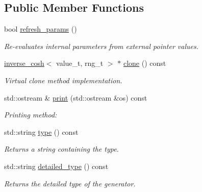 \subsection*{Public Member Functions}
\begin{DoxyCompactItemize}
\item 
bool \hyperlink{a00320_af6c6edb1d3b7a3be19759225598eff8c}{refresh\+\_\+params} ()
\begin{DoxyCompactList}\small\item\em Re-\/evaluates internal parameters from external pointer values. \end{DoxyCompactList}\item 
\hypertarget{a00320_a93ef78d56e7320e6b6a7390778948174}{}\hyperlink{a00320}{inverse\+\_\+cosh}$<$ value\+\_\+t, rng\+\_\+t $>$ $\ast$ \hyperlink{a00320_a93ef78d56e7320e6b6a7390778948174}{clone} () const \label{a00320_a93ef78d56e7320e6b6a7390778948174}

\begin{DoxyCompactList}\small\item\em Virtual clone method implementation. \end{DoxyCompactList}\item 
\hypertarget{a00320_a76a112a6561c0889cff37180e653f1ca}{}std\+::ostream \& \hyperlink{a00320_a76a112a6561c0889cff37180e653f1ca}{print} (std\+::ostream \&os) const \label{a00320_a76a112a6561c0889cff37180e653f1ca}

\begin{DoxyCompactList}\small\item\em Printing method\+: \end{DoxyCompactList}\item 
\hypertarget{a00320_a97b707c10a740dd740f55b7e33f7f75c}{}std\+::string \hyperlink{a00320_a97b707c10a740dd740f55b7e33f7f75c}{type} () const \label{a00320_a97b707c10a740dd740f55b7e33f7f75c}

\begin{DoxyCompactList}\small\item\em Returns a string containing the type. \end{DoxyCompactList}\item 
\hypertarget{a00320_a752a37517d08a2b943c5e918501e59e2}{}std\+::string \hyperlink{a00320_a752a37517d08a2b943c5e918501e59e2}{detailed\+\_\+type} () const \label{a00320_a752a37517d08a2b943c5e918501e59e2}

\begin{DoxyCompactList}\small\item\em Returns the detailed type of the generator. \end{DoxyCompactList}\end{DoxyCompactItemize}
